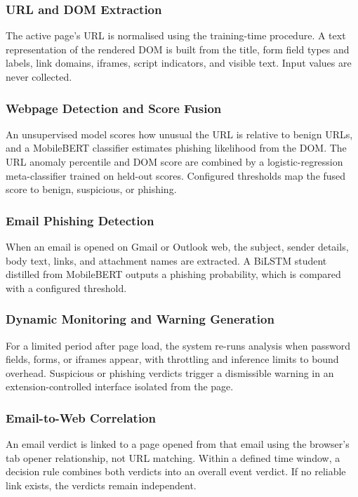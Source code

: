 \documentclass{FastFyp}
\begin{document}
\subsubsection{URL and DOM Extraction}

The active page's URL is normalised using the training-time procedure. A text representation of the rendered DOM is built from the title, form field types and labels, link domains, iframes, script indicators, and visible text. Input values are never collected.

\subsubsection{Webpage Detection and Score Fusion}

An unsupervised model scores how unusual the URL is relative to benign URLs, and a MobileBERT classifier estimates phishing likelihood from the DOM. The URL anomaly percentile and DOM score are combined by a logistic-regression meta-classifier trained on held-out scores. Configured thresholds map the fused score to benign, suspicious, or phishing.

\subsubsection{Email Phishing Detection}

When an email is opened on Gmail or Outlook web, the subject, sender details, body text, links, and attachment names are extracted. A BiLSTM student distilled from MobileBERT outputs a phishing probability, which is compared with a configured threshold.

\subsubsection{Dynamic Monitoring and Warning Generation}

For a limited period after page load, the system re-runs analysis when password fields, forms, or iframes appear, with throttling and inference limits to bound overhead. Suspicious or phishing verdicts trigger a dismissible warning in an extension-controlled interface isolated from the page.

\subsubsection{Email-to-Web Correlation}

An email verdict is linked to a page opened from that email using the browser's tab opener relationship, not URL matching. Within a defined time window, a decision rule combines both verdicts into an overall event verdict. If no reliable link exists, the verdicts remain independent.
\end{document}
